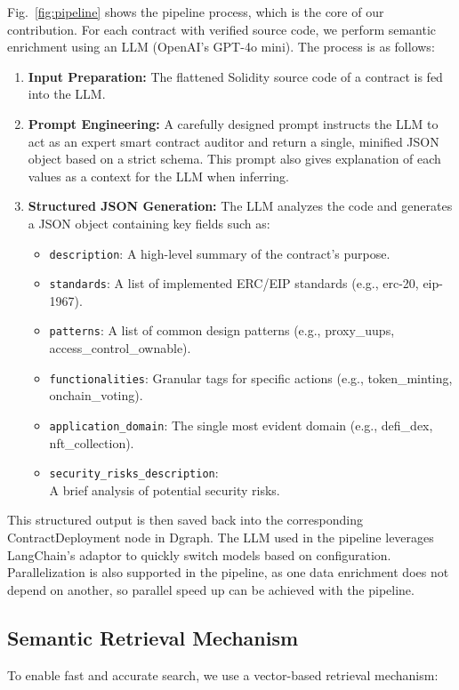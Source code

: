 Fig.~\ref{fig:pipeline} shows the pipeline process, which is the core of our contribution. For each contract with verified source code, we perform semantic enrichment using an LLM (OpenAI's GPT-4o mini). The process is as follows:
\begin{enumerate}
	\item \textbf{Input Preparation:} The flattened Solidity source code of a contract is fed into the LLM.
	\item \textbf{Prompt Engineering:} A carefully designed prompt instructs the LLM to act as an expert smart contract auditor and return a single, minified JSON object based on a strict schema. This prompt also gives explanation of each values as a context for the LLM when inferring.
	\item \textbf{Structured JSON Generation:} The LLM analyzes the code and generates a JSON object containing key fields such as:
	      \begin{itemize}
		      \item \texttt{description}: A high-level summary of the contract's purpose.
		      \item \texttt{standards}: A list of implemented ERC/EIP standards (e.g., erc-20, eip-1967).
		      \item \texttt{patterns}: A list of common design patterns (e.g., proxy\_uups, access\_control\_ownable).
		      \item \texttt{functionalities}: Granular tags for specific actions (e.g., token\_minting, onchain\_voting).
		      \item \texttt{application\_domain}: The single most evident domain (e.g., defi\_dex, nft\_collection).
		      \item \texttt{security\_risks\_description}: \\A brief analysis of potential security risks.
	      \end{itemize}
\end{enumerate}

This structured output is then saved back into the corresponding ContractDeployment node in Dgraph. The LLM used in the pipeline leverages LangChain's adaptor to quickly switch models based on configuration. Parallelization is also supported in the pipeline, as one data enrichment does not depend on another, so parallel speed up can be achieved with the pipeline.

\subsection{Semantic Retrieval Mechanism}
To enable fast and accurate search, we use a vector-based retrieval mechanism:

